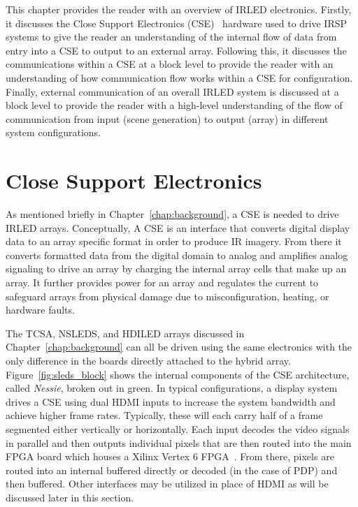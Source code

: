 \label{chap:system_overview}
This chapter provides the reader with an overview of IRLED electronics. Firstly, it discusses the Close Support Electronics (CSE)~\cite{EjzakEtAl2015,HernandezEtAl2019,SinghEtAl2020} hardware used to drive IRSP systems to give the reader an understanding of the internal flow of data from entry into a CSE to output to an external array. Following this, it discusses the communications within a CSE at a block level to provide the reader with an understanding of how communication flow works within a CSE for configuration. Finally, external communication of an overall IRLED system is discussed at a block level to provide the reader with a high-level understanding of the flow of communication from input (scene generation) to output (array) in different system configurations.

\section{Close Support Electronics}
    \label{sec:close_support_electronics}
    As mentioned briefly in Chapter~\ref{chap:background}, a CSE is needed to drive IRLED arrays. Conceptually, A CSE is an interface that converts digital display data to an array specific format in order to produce IR imagery. From there it converts formatted data from the digital domain to analog and amplifies analog signaling to drive an array by charging the internal array cells that make up an array. It further provides power for an array and regulates the current to safeguard arrays from physical damage due to misconfiguration, heating, or hardware faults.

    The TCSA, NSLEDS, and HDILED arrays discussed in Chapter~\ref{chap:background} can all be driven using the same electronics with the only difference in the boards directly attached to the hybrid array. Figure~\ref{fig:sleds_block} shows the internal components of the CSE architecture, called {\it Nessie}, broken out in green. In typical configurations, a display system drives a CSE using dual HDMI inputs to increase the system bandwidth and achieve higher frame rates. Typically, these will each carry half of a frame segmented either vertically or horizontally. Each input decodes the video signals in parallel and then outputs individual pixels that are then routed into the main FPGA board which houses a Xilinx Vertex 6 FPGA~\cite{XILINX2015}. From there, pixels are routed into an internal buffered directly or decoded (in the case of PDP) and then buffered. Other interfaces may be utilized in place of HDMI as will be discussed later in this section.

